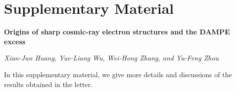 
\section{Supplementary Material}

\renewcommand{\theequation}{S-\arabic{equation}}
\setcounter{equation}{0}

\renewcommand{\thefigure}{S-\arabic{figure}}
\setcounter{figure}{0}

\renewcommand{\thetable}{S-\arabic{table}}
\setcounter{table}{0}


\vskip 12pt
\centerline{\bf \large Origins of  sharp cosmic-ray electron structures and the DAMPE excess}
\centerline{\it Xian-Jun Huang, Yue-Liang Wu, Wei-Hong Zhang, and Yu-Feng Zhou}
\vskip 12pt

In this supplementary material, we give more details and discussions of the results obtained 
in the letter.

